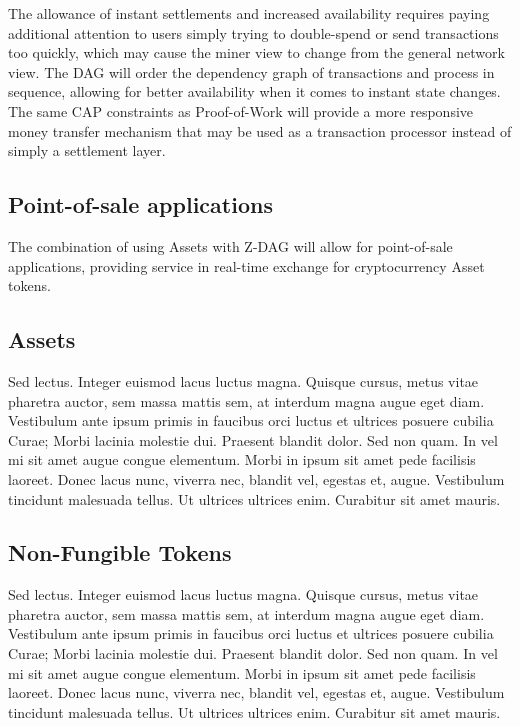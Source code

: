 \documentclass[peerreview]{ieeesyscoin}
\begin{document}
The allowance of instant settlements and increased availability requires paying additional attention to users simply
trying to double-spend or send transactions too quickly,
which may cause the miner view to change from the general
network view. The DAG will order the dependency graph
of transactions and process in sequence, allowing for better
availability when it comes to instant state changes. The
same CAP constraints as Proof-of-Work will provide a more
responsive money transfer mechanism that may be used as
a transaction processor instead of simply a settlement layer.

\subsection{Point-of-sale applications}
The combination of using Assets with Z-DAG will allow for point-of-sale applications, providing service in real-time exchange for cryptocurrency Asset tokens.

\subsection{Assets}
Sed lectus. Integer euismod lacus luctus magna. Quisque cursus, metus vitae pharetra auctor, sem massa mattis sem, at interdum magna augue eget diam. Vestibulum ante ipsum primis in faucibus orci luctus et ultrices posuere cubilia Curae; Morbi lacinia molestie dui. Praesent blandit dolor. Sed non quam. In vel mi sit amet augue congue elementum. Morbi in ipsum sit amet pede facilisis laoreet. Donec lacus nunc, viverra nec, blandit vel, egestas et, augue. Vestibulum tincidunt malesuada tellus. Ut ultrices ultrices enim. Curabitur sit amet mauris. 

\subsection{Non-Fungible Tokens}

Sed lectus. Integer euismod lacus luctus magna. Quisque cursus, metus vitae pharetra auctor, sem massa mattis sem, at interdum magna augue eget diam. Vestibulum ante ipsum primis in faucibus orci luctus et ultrices posuere cubilia Curae; Morbi lacinia molestie dui. Praesent blandit dolor. Sed non quam. In vel mi sit amet augue congue elementum. Morbi in ipsum sit amet pede facilisis laoreet. Donec lacus nunc, viverra nec, blandit vel, egestas et, augue. Vestibulum tincidunt malesuada tellus. Ut ultrices ultrices enim. Curabitur sit amet mauris. 
\end{document}
